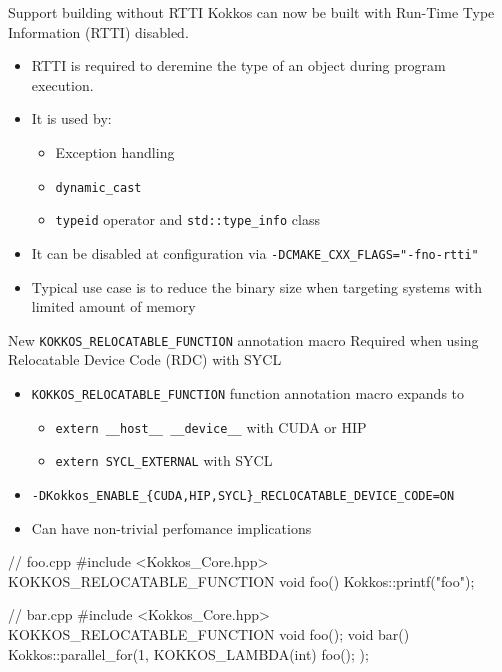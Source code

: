 \begin{frame}[fragile]{Support building without RTTI}
Kokkos can now be built with Run-Time Type Information (RTTI) disabled.
\vspace{10pt}
\begin{itemize}
\item RTTI is required to deremine the type of an object during program execution.
\item It is used by:
  \begin{itemize}
  \item Exception handling
  \item \texttt{dynamic\_cast}
  \item \texttt{typeid} operator and \texttt{std::type\_info} class
  \end{itemize}
\item It can be disabled at configuration via \texttt{-DCMAKE\_CXX\_FLAGS="-fno-rtti"}
\item Typical use case is to reduce the binary size when targeting systems with limited amount of memory
\end{itemize}
\end{frame}


\begin{frame}[fragile]{New \texttt{KOKKOS\_RELOCATABLE\_FUNCTION} annotation macro}
Required when using Relocatable Device Code (RDC) with SYCL
\begin{itemize}
\item \texttt{KOKKOS\_RELOCATABLE\_FUNCTION} function annotation macro expands to
  \begin{itemize}
  \item \texttt{extern \_\_host\_\_ \_\_device\_\_} with CUDA or HIP
  \item \texttt{extern SYCL\_EXTERNAL} with SYCL
  \end{itemize}
\item \texttt{-DKokkos\_ENABLE\_\{CUDA,HIP,SYCL\}\_RECLOCATABLE\_DEVICE\_CODE=ON}
\item Can have non-trivial perfomance implications
\end{itemize}

\begin{code}
// foo.cpp
#include <Kokkos_Core.hpp>
KOKKOS_RELOCATABLE_FUNCTION void foo() { Kokkos::printf("foo\n"); }

// bar.cpp
#include <Kokkos_Core.hpp>
KOKKOS_RELOCATABLE_FUNCTION void foo();
void bar() { Kokkos::parallel_for(1, KOKKOS_LAMBDA(int) { foo(); }); }
\end{code}
\end{frame}

